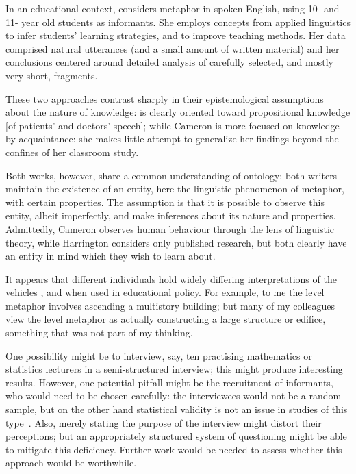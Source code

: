 In an educational context,  considers metaphor in
spoken English, using 10- and 11- year old students as informants.
She employs concepts from applied linguistics to infer students'
learning strategies, and to improve teaching methods.  Her data
comprised natural utterances (and a small amount of written material)
and her conclusions centered around detailed analysis of carefully
selected, and mostly very short, fragments.

These two approaches contrast sharply in their epistemological
assumptions about the nature of knowledge: \citeauthor{harrington2012}
is clearly oriented toward propositional knowledge [of patients' and
  doctors' speech]; while Cameron is more focused on knowledge by
acquaintance: she makes little attempt to generalize her findings
beyond the confines of her classroom study.

Both works, however, share a common understanding of ontology: both
writers maintain the existence of an entity, here the linguistic
phenomenon of metaphor, with certain properties.  The assumption is
that it is possible to observe this entity, albeit imperfectly, and
make inferences about its nature and properties.  Admittedly, Cameron
observes human behaviour through the lens of linguistic theory, while
Harrington considers only published research, but both clearly have an
entity in mind which they wish to learn about.

It appears that different individuals hold widely differing
interpretations of the vehicles , 
and  when used in educational policy.  For example,
to me the level metaphor involves ascending a multistory building; but
many of my colleagues view the level metaphor as actually constructing
a large structure or edifice, something that was not part of my
thinking.

One possibility might be to interview, say, ten practising mathematics
or statistics lecturers in a semi-structured interview; this might
produce interesting results.  However, one potential pitfall might be
the recruitment of informants, who would need to be chosen carefully:
the interviewees would not be a random sample, but on the other hand
statistical validity is not an issue in studies of this
type~\citep{ribbins2012}.  Also, merely stating the purpose of the
interview might distort their perceptions; but an appropriately
structured system of questioning might be able to mitigate this
deficiency.  Further work would be needed to assess whether this
approach would be worthwhile.

